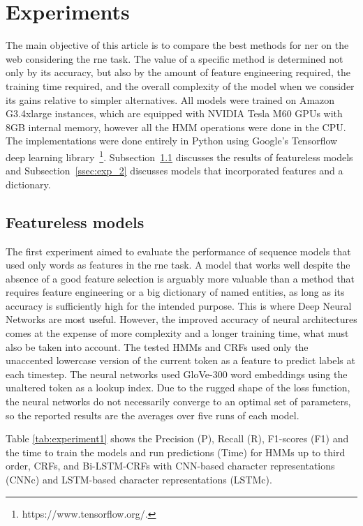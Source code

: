 \documentclass{nle}
\begin{document}
\section{Experiments}

The main objective of this article is to compare the best methods for \gls{ner} on the 
web considering the \gls{rne} task. The value of a specific method is determined
not only by its accuracy, but also by the amount of feature engineering required, the training
time required, and the overall complexity of the model when we consider its gains relative to
simpler alternatives. All models were trained on Amazon G3.4xlarge instances, which are equipped with 
NVIDIA Tesla M60 GPUs with 8GB internal memory, however all the HMM operations were done in the CPU.
The implementations were done entirely in Python using Google's Tensorflow deep learning 
library~\footnote{https://www.tensorflow.org/.}. 
Subsection~\ref{ssec:exp_1} discusses the results of featureless models and Subsection~\ref{ssec:exp_2} 
discusses models that incorporated features and a dictionary.


\subsection{Featureless models}
\label{ssec:exp_1}

The first experiment aimed to evaluate the performance of sequence models that used 
only words as features in the \gls{rne} task.
A model that works well despite the absence of a good feature selection is arguably more valuable than
a method that requires feature engineering or a big dictionary of named entities, as long as 
its accuracy is sufficiently high for the intended purpose. This is where Deep Neural Networks are most
useful. However, the improved accuracy of neural architectures comes at the expense of more complexity
and a longer training time, what must also be taken into account. 
The tested HMMs and CRFs used only the unaccented lowercase version of the current token as a feature
to predict labels at each timestep. The neural networks used GloVe-300 word embeddings using the 
unaltered token as a lookup index. Due to the rugged shape of the loss function, the neural networks 
do not necessarily converge to an optimal set of parameters, so the reported results are the averages
over five runs of each model. 

Table \ref{tab:experiment1} shows the Precision (P), Recall (R), F1-scores (F1) and the time to 
train the models and run predictions (Time) for HMMs up to third order, CRFs, and Bi-LSTM-CRFs with
CNN-based character representations (CNNc) and LSTM-based character representations (LSTMc).
\end{document}
